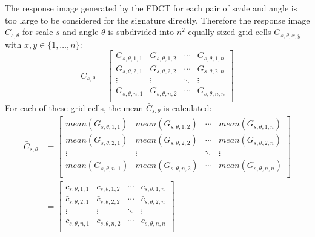 The response image generated by the FDCT for each pair of scale and angle is
too large to be considered for the signature directly. Therefore the response
image $C_{s, \theta}$ for scale $s$ and angle $\theta$ is subdivided into $n^2$
equally sized grid cells $G_{s, \theta, x, y}$ with $x, y \in \{1, \dots, n\}$:
\begin{equation*}
    C_{s,\theta} =
    \begin{bmatrix}
        G_{s,\theta,1,1} & G_{s,\theta,1,2} & \cdots & G_{s,\theta,1,n} \\
        G_{s,\theta,2,1} & G_{s,\theta,2,2} & \cdots & G_{s,\theta,2,n} \\
        \vdots  & \vdots  & \ddots & \vdots  \\
        G_{s,\theta,n,1} & G_{s,\theta,n,2} & \cdots & G_{s,\theta,n,n} \\
    \end{bmatrix}
\end{equation*}
For each of these grid cells, the mean $\bar{C}_{s, \theta}$ is calculated:
\begin{align*}
    \bar{C}_{s,\theta} &=
    \begin{bmatrix}
        mean(G_{s,\theta,1,1}) & mean(G_{s,\theta,1,2}) & \cdots & mean(G_{s,\theta,1,n}) \\
        mean(G_{s,\theta,2,1}) & mean(G_{s,\theta,2,2}) & \cdots & mean(G_{s,\theta,2,n}) \\
        \vdots  & \vdots  & \ddots & \vdots  \\
        mean(G_{s,\theta,n,1}) & mean(G_{s,\theta,n,2}) & \cdots & mean(G_{s,\theta,n,n}) \\
    \end{bmatrix} \\
    &=
    \begin{bmatrix}
        \bar{c}_{s,\theta,1,1} & \bar{c}_{s,\theta,1,2} & \cdots & \bar{c}_{s,\theta,1,n} \\
        \bar{c}_{s,\theta,2,1} & \bar{c}_{s,\theta,2,2} & \cdots & \bar{c}_{s,\theta,2,n} \\
        \vdots  & \vdots  & \ddots & \vdots  \\
        \bar{c}_{s,\theta,n,1} & \bar{c}_{s,\theta,n,2} & \cdots & \bar{c}_{s,\theta,n,n} \\
    \end{bmatrix}
\end{align*}

